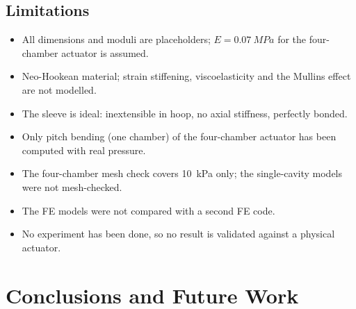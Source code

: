 \documentclass[12pt,a4paper,oneside]{report}
\numberwithin{equation}{chapter}
\numberwithin{figure}{chapter}
\numberwithin{table}{chapter}
\begin{document}
\section{Limitations}\label{sec:limits}
\begin{itemize}
\item All dimensions and moduli are placeholders; $E=\SI{0.07}{MPa}$ for the four-chamber actuator is assumed.
\item Neo-Hookean material; strain stiffening, viscoelasticity and the Mullins effect are not modelled.
\item The sleeve is ideal: inextensible in hoop, no axial stiffness, perfectly bonded.
\item Only pitch bending (one chamber) of the four-chamber actuator has been computed with real pressure.
\item The four-chamber mesh check covers \SI{10}{kPa} only; the single-cavity models were not mesh-checked.
\item The FE models were not compared with a second FE code.
\item No experiment has been done, so no result is validated against a physical actuator.
\end{itemize}

\chapter{Conclusions and Future Work}\label{ch:conclusion}
\end{document}
